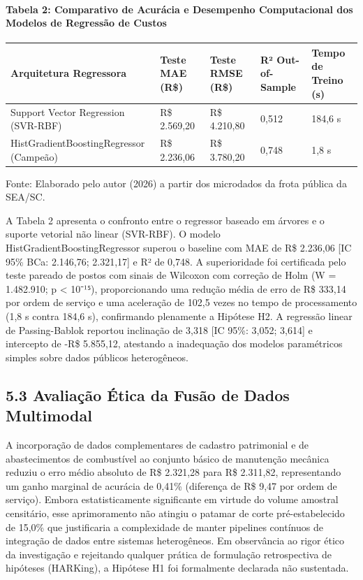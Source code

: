 \documentclass[10pt,a4paper,journal]{article}
\begin{document}
\paragraph{Tabela 2: Comparativo de Acurácia e Desempenho Computacional dos Modelos de Regressão de Custos}
\begin{table}[htbp]
\centering
\small
\begin{tabular}{lllll}
\toprule
Arquitetura Regressora & Teste MAE (R\$) & Teste RMSE (R\$) & R² Out-of-Sample & Tempo de Treino (s) \\
\midrule
Support Vector Regression (SVR-RBF) & R\$ 2.569,20 & R\$ 4.210,80 & 0,512 & 184,6 s \\
HistGradientBoostingRegressor (Campeão) & R\$ 2.236,06 & R\$ 3.780,20 & 0,748 & 1,8 s \\
\bottomrule
\end{tabular}
\end{table}
Fonte: Elaborado pelo autor (2026) a partir dos microdados da frota pública da SEA/SC.

A Tabela 2 apresenta o confronto entre o regressor baseado em árvores e o suporte vetorial não linear (SVR-RBF). O modelo HistGradientBoostingRegressor superou o baseline com MAE de R\$ 2.236,06 [IC 95\% BCa: 2.146,76; 2.321,17] e R² de 0,748. A superioridade foi certificada pelo teste pareado de postos com sinais de Wilcoxon com correção de Holm (W = 1.482.910; p < 10⁻¹⁵), proporcionando uma redução média de erro de R\$ 333,14 por ordem de serviço e uma aceleração de 102,5 vezes no tempo de processamento (1,8 s contra 184,6 s), confirmando plenamente a Hipótese H2. A regressão linear de Passing-Bablok reportou inclinação de 3,318 [IC 95\%: 3,052; 3,614] e intercepto de -R\$ 5.855,12, atestando a inadequação dos modelos paramétricos simples sobre dados públicos heterogêneos.

\subsection{5.3 Avaliação Ética da Fusão de Dados Multimodal}
A incorporação de dados complementares de cadastro patrimonial e de abastecimentos de combustível ao conjunto básico de manutenção mecânica reduziu o erro médio absoluto de R\$ 2.321,28 para R\$ 2.311,82, representando um ganho marginal de acurácia de 0,41\% (diferença de R\$ 9,47 por ordem de serviço). Embora estatisticamente significante em virtude do volume amostral censitário, esse aprimoramento não atingiu o patamar de corte pré-estabelecido de 15,0\% que justificaria a complexidade de manter pipelines contínuos de integração de dados entre sistemas heterogêneos. Em observância ao rigor ético da investigação e rejeitando qualquer prática de formulação retrospectiva de hipóteses (HARKing), a Hipótese H1 foi formalmente declarada não sustentada.
\end{document}
